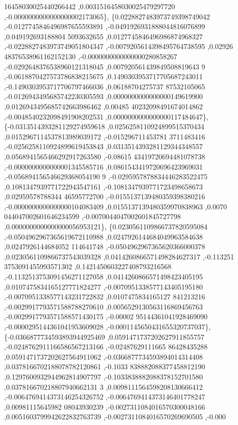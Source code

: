 \begin{DoxyCode}
      16458030025440266442 ,0.0031516458030025479297720 ,-0.0000000000000000002173065\},
\{0.0228827483973749398749042 ,-0.0127745846496987655593891 ,-0.0491926931888044816076899 ,0.049192693188804
      5093632655 ,0.0127745846496986874968327 ,-0.0228827483973749051804347 ,-0.0079205614398495764738595 ,0.02926
      48376538961162152130 ,-0.0000000000000000280858267 ,-0.0292648376538960121318045 ,0.007920561439849508819643
      9 ,-0.0618870427573786838215675 ,0.1490303953717705687243011 ,-0.1490303953717706797466036 ,0.06188704275737
      87532105065 ,-0.0126943495685742230305593 ,0.0000000000000000149619900 ,0.0126943495685742663986462 ,0.00485
      40232098491674014862 ,-0.0048540232098491908202531 ,0.0000000000000000117484647\},
\{-0.0313514393281129274959618 ,0.0256258110924899515370434 ,0.0152967114537813989039172 ,-0.015296711453781
      3711483416 ,-0.0256258110924899619453843 ,0.0313514393281129344348557 ,0.0568941565466292917263580 ,-0.08615
      43419720694481078738 ,-0.0000000000000001345585716 ,0.0861543419720696423969031 ,-0.056894156546629368054190
      9 ,-0.0295957878834446283522475 ,0.1081347939771722943547161 ,-0.1081347939771723498658673 ,0.02959578788344
      46595772700 ,-0.0155137139480359398380216 ,-0.0000000000000000104083409 ,0.0155137139480359970838963 ,0.0070
      044047002601646234599 ,-0.0070044047002601845727798 ,0.0000000000000000056953121\},
\{0.0230561109866737820595084 ,-0.0504962967365619672110988 ,0.0247926144684049963584638 ,0.0247926144684052
      114641748 ,-0.0504962967365620366000378 ,0.0230561109866737543039328 ,0.0414260866571498284627317 ,-0.113251
      3753091455993571302 ,0.1421450603227408793216568 ,-0.1132513753091456271127058 ,0.0414260866571498423405195 
      ,0.0107475834165127771824277 ,-0.0070951338577143405195180 ,-0.0070951338577143231722832 ,0.0107475834165127
      841213216 ,-0.0029917793571588788270610 ,0.0056529130563116869456763 ,-0.0029917793571588571430175 ,-0.00002
      95144361041928469090 ,-0.0000295144361041953609028 ,-0.0001145650431655320737037\},
\{-0.0366877734593893944925469 ,0.0591471737202627911855757 ,-0.0248762911166586567213166 ,-0.02487629111665
      86428435288 ,0.0591471737202627564911062 ,-0.0366877734593894014314408 ,0.0378166702188078782120861 ,-0.1033
      838882088377458812190 ,0.1297600932944962814907797 ,-0.1033838882088378152701580 ,0.037816670218807940662131
      3 ,0.0098111564598208130666412 ,-0.0064769414373146254326752 ,-0.0064769414373146401778247 ,0.00981115645982
      08043930239 ,-0.0027311084016570300048166 ,0.0051603799942622832763739 ,-0.0027311084016570269690505 ,-0.000

\end{DoxyCode}
